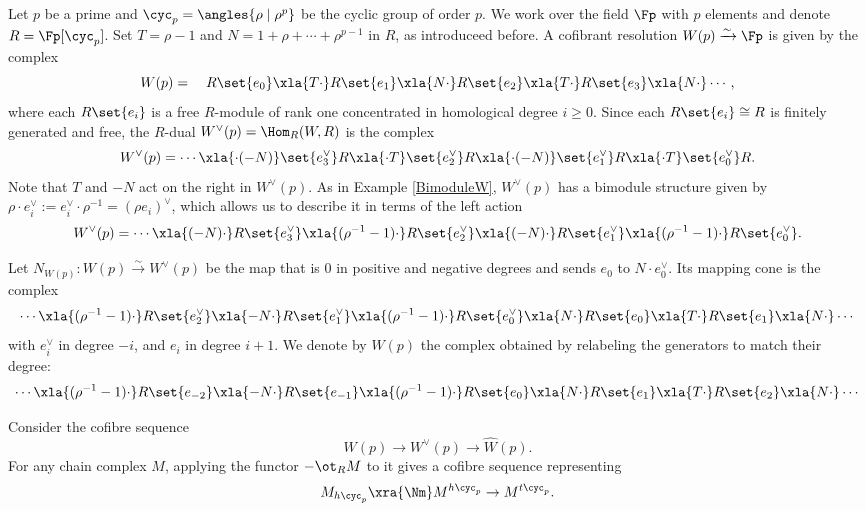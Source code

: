 Let \(p\) be a prime and \(\cyc_p = \angles{\rho \mid \rho^p}\) be the cyclic group of order \(p\).
We work over the field \(\Fp\) with \(p\) elements and denote \(R = \Fp[\cyc_p]\).
Set \(T = \rho - 1\) and \(N = 1 + \rho + \cdots + \rho^{p-1}\) in \(R\), as introduceed before.
A cofibrant resolution \(W(p) \xrightarrow{\sim} \Fp\) is given by the complex
\[
W(p) = \quad R\set{e_0} \xla{T\cdot} R\set{e_1} \xla{N\cdot} R\set{e_2} \xla{T\cdot} R\set{e_3} \xla{N\cdot} \cdots,
\]
where each \(R\set{e_i}\) is a free \(R\)-module of rank one concentrated in homological degree \(i \geq 0\).
Since each \(R\set{e_i} \cong R\) is finitely generated and free, the \(R\)-dual \(W^\vee(p) = \Hom_R(W, R)\) is the complex
\[
W^\vee(p) = \cdots \xla{\cdot (- N)} \set{e_3^\vee}R\xla{\cdot T} \set{e_2^\vee}R \xla{\cdot (- N)} \set{e_1^\vee}R \xla{\cdot T} \set{e_0^\vee}R.
\]
Note that $T$ and $-N$ act on the right in $W^\vee(p)$. As in Example \ref{BimoduleW}, $W^\vee(p)$ has a bimodule structure given by $\rho\cdot e_i^\vee:=e_i^\vee\cdot \rho^{-1}=(\rho e_i)^\vee$, which allows us to describe it in terms of the left action
\[
W^\vee(p) = \cdots \xla{(- N)\cdot} R\set{e_3^\vee}\xla{(\rho^{-1}-1)\cdot} R\set{e_2^\vee} \xla{(- N)\cdot} R\set{e_1^\vee} \xla{(\rho^{-1}-1)\cdot} R\set{e_0^\vee}.
\]


Let \(N_{W(p)} \colon W(p) \xrightarrow{\sim} W^\vee(p)\) be the map that is \(0\) in positive and negative degrees and sends \(e_0\) to \(N \cdot e_0^\vee\).
Its mapping cone is the complex
\[
 \cdots \xla{(\rho^{-1}-1)\cdot} R\set{e_2^\vee} \xla{-N\cdot} R\set{e_{1}^\vee} \xla{(\rho^{-1}-1)\cdot} R\set{e_0^\vee} \xla{N\cdot} R\set{e_0} \xla{T\cdot} R\set{e_1} \xla{N\cdot} \cdots
\]
with \(e_i^\vee\) in degree \(-i\), and $e_i$ in degree $i+1$. We denote by $\widehat W(p)$ the complex obtained by relabeling the generators to match their degree:
\[
 \cdots \xla{(\rho^{-1}-1)\cdot} R\set{e_{-2}} \xla{-N\cdot} R\set{e_{-1}} \xla{(\rho^{-1}-1)\cdot} R\set{e_0} \xla{N\cdot} R\set{e_1} \xla{T\cdot} R\set{e_2} \xla{N\cdot} \cdots
\]

Consider the cofibre sequence
\[
W(p) \to W^\vee(p) \to \widehat W(p).
\]
For any chain complex \(M\), applying the functor \(- \ot_R M\) to it gives a cofibre sequence representing
\begin{equation}
M_{h\cyc_p} \xra{\Nm} M^{h\cyc_p} \to M^{t\cyc_p}.
\label{CofibreM}
\end{equation}

